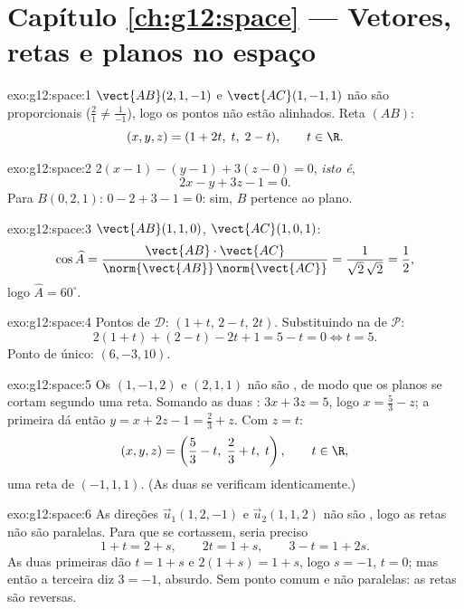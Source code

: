 \section*{Capítulo \ref{ch:g12:space} --- Vetores, retas e planos no espaço}

\begin{solution}{exo:g12:space:1}
$\vect{AB}(2, 1, -1)$ e $\vect{AC}(1, -1, 1)$ não são proporcionais
($\frac21 \neq \frac{1}{-1}$), logo os pontos não estão alinhados. Reta
$(AB)$:
\[
(x, y, z) = (1 + 2t,\; t,\; 2 - t), \qquad t \in \R .
\]
\end{solution}

\begin{solution}{exo:g12:space:2}
$2(x - 1) - (y - 1) + 3(z - 0) = 0$, \emph{isto é},
\[
2x - y + 3z - 1 = 0 .
\]
Para $B(0,2,1)$: $0 - 2 + 3 - 1 = 0$: sim, $B$ pertence ao plano.
\end{solution}

\begin{solution}{exo:g12:space:3}
$\vect{AB}(1,1,0)$, $\vect{AC}(1,0,1)$:
\[
\cos\widehat{A}
= \frac{\vect{AB}\cdot\vect{AC}}{\norm{\vect{AB}}\,\norm{\vect{AC}}}
= \frac{1}{\sqrt2\,\sqrt2} = \frac12,
\]
logo $\widehat A = 60^\circ$.
\end{solution}

\begin{solution}{exo:g12:space:4}
Pontos de $\mathcal D$: $(1 + t,\, 2 - t,\, 2t)$. Substituindo na 
de $\mathcal P$:
\[
2(1+t) + (2 - t) - 2t + 1 = 5 - t = 0 \iff t = 5 .
\]
Ponto de  único: $(6, -3, 10)$.
\end{solution}

\begin{solution}{exo:g12:space:5}
Os  $(1, -1, 2)$ e $(2, 1, 1)$ não são , de modo
que os planos se cortam segundo uma reta. Somando as duas :
$3x + 3z = 5$, logo $x = \frac53 - z$; a primeira  dá então
$y = x + 2z - 1 = \frac23 + z$. Com $z = t$:
\[
(x, y, z) = \left(\frac53 - t,\; \frac23 + t,\; t\right), \qquad t \in \R,
\]
uma reta de  $(-1, 1, 1)$. (As duas  se verificam
identicamente.)
\end{solution}

\begin{solution}{exo:g12:space:6}
As direções $\vec u_1(1, 2, -1)$ e $\vec u_2(1, 1, 2)$ não são ,
logo as retas não são paralelas. Para que se cortassem, seria preciso
\[
1 + t = 2 + s, \qquad 2t = 1 + s, \qquad 3 - t = 1 + 2s .
\]
As duas primeiras dão $t = 1 + s$ e $2(1+s) = 1 + s$, logo $s = -1$,
$t = 0$; mas então a terceira diz $3 = -1$, absurdo. Sem ponto comum e não
paralelas: as retas são reversas.
\end{solution}

